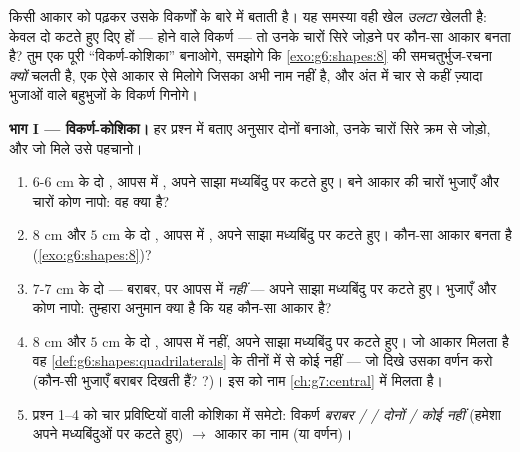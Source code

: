 \begin{problem}
\label{pb:g6:shapes:1}
 किसी आकार को पढ़कर उसके विकर्णों
के बारे में बताती है। यह समस्या वही खेल \emph{उलटा} खेलती है:
केवल दो कटते हुए  दिए हों --- होने वाले विकर्ण --- तो उनके
चारों सिरे जोड़ने पर कौन-सा आकार बनता है? तुम एक पूरी
``विकर्ण-कोशिका'' बनाओगे, समझोगे कि \cref{exo:g6:shapes:8} की
समचतुर्भुज-रचना \emph{क्यों} चलती है, एक ऐसे आकार से मिलोगे
जिसका अभी नाम नहीं है, और अंत में चार से कहीं ज़्यादा भुजाओं वाले
बहुभुजों के विकर्ण गिनोगे।

\medskip
\noindent\textbf{भाग I --- विकर्ण-कोशिका।}
हर प्रश्न में बताए अनुसार दोनों  बनाओ, उनके चारों सिरे
क्रम से जोड़ो, और जो  मिले उसे पहचानो।
\begin{enumerate}
  \item $6$-$6$ cm के दो , आपस में , अपने साझा
        मध्यबिंदु पर कटते हुए। बने आकार की चारों भुजाएँ और चारों
        कोण नापो: वह क्या है?
  \item $8$ cm और $5$ cm के दो , आपस में , अपने साझा
        मध्यबिंदु पर कटते हुए। कौन-सा आकार बनता है
        (\cref{exo:g6:shapes:8})?
  \item $7$-$7$ cm के दो  --- बराबर, पर आपस में 
        \emph{नहीं} --- अपने साझा मध्यबिंदु पर कटते हुए।
        भुजाएँ और कोण नापो: तुम्हारा अनुमान क्या है कि यह
        कौन-सा आकार है?
  \item $8$ cm और $5$ cm के दो , आपस में  नहीं, अपने
        साझा मध्यबिंदु पर कटते हुए। जो आकार मिलता है वह
        \cref{def:g6:shapes:quadrilaterals} के तीनों में से कोई
        नहीं --- जो दिखे उसका वर्णन करो (कौन-सी भुजाएँ बराबर
        दिखती हैं? ?)। इस  को नाम
        \cref{ch:g7:central} में मिलता है।
  \item प्रश्न 1--4 को चार प्रविष्टियों वाली कोशिका में समेटो:
        विकर्ण \emph{बराबर /  / दोनों / कोई नहीं} (हमेशा अपने
        मध्यबिंदुओं पर कटते हुए)
        $\rightarrow$ आकार का नाम (या वर्णन)।
\end{enumerate}


\end{problem}
